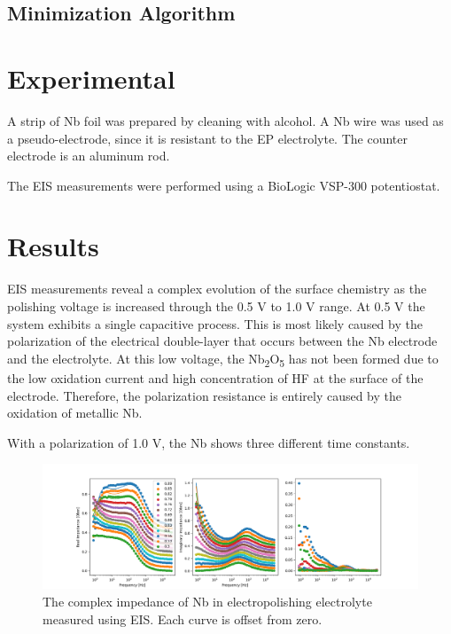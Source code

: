 \documentclass[11pt]{article}
\begin{document}
\subsection{Minimization Algorithm}
\label{sec:org7092583}




\section{Experimental}
\label{sec:orgb71f960}



A strip of Nb foil was prepared by cleaning with alcohol. A Nb wire was used as a pseudo-electrode, since it is resistant to the EP electrolyte. The counter electrode is an aluminum rod.

The EIS measurements were performed using a BioLogic VSP-300 potentiostat.



\section{Results}
\label{sec:org4a45003}

EIS measurements reveal a complex evolution of the surface chemistry as the polishing voltage is increased through the 0.5 V to 1.0 V range. At 0.5 V the system exhibits a single capacitive process. This is most likely caused by the polarization of the electrical double-layer that occurs between the Nb electrode and the electrolyte. At this low voltage, the Nb\textsubscript{2}O\textsubscript{5} has not been formed due to the low oxidation current and high concentration of HF at the surface of the electrode. Therefore, the polarization resistance is entirely caused by the oxidation of metallic Nb.

With a polarization of 1.0 V, the Nb shows three different time constants.

\begin{figure}
  \label{fig:bodeplot}
  \includegraphics[]{figures/bodeplot.png}
  \caption{The complex impedance of Nb in electropolishing electrolyte measured using EIS. Each curve is offset from zero.}
\end{figure}
\end{document}
